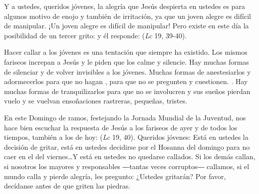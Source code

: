 \begin{body}
Y a ustedes, queridos jóvenes, la alegría que Jesús despierta en ustedes es para algunos motivo de enojo y también de irritación, ya que un joven alegre es difícil de manipular. ¡Un joven alegre es difícil de manipular! Pero existe en este día la posibilidad de un tercer grito:  y él responde:  (\textit{Lc} 19, 39-40).

Hacer callar a los jóvenes es una tentación que siempre ha existido. Los mismos fariseos increpan a Jesús y le piden que los calme y silencie. Hay muchas formas de silenciar y de volver invisibles a los jóvenes. Muchas formas de anestesiarlos y adormecerlos para que no hagan , para que no se pregunten y cuestionen. . Hay muchas formas de tranquilizarlos para que no se involucren y sus sueños pierdan vuelo y se vuelvan ensoñaciones rastreras, pequeñas, tristes.


En este Domingo de ramos, festejando la Jornada Mundial de la Juventud, nos hace bien escuchar la respuesta de Jesús a los fariseos de ayer y de todos los tiempos, también a los de hoy:  (\textit{Lc} 19, 40). Queridos jóvenes: Está en ustedes la decisión de gritar, está en ustedes decidirse por el Hosanna del domingo para no caer en el  del viernes\ldots Y está en ustedes no quedarse callados. Si los demás callan, si nosotros los mayores y responsables ―tantas veces corruptos― callamos, si el mundo calla y pierde alegría, les pregunto: ¿Ustedes gritarán? Por favor, decídanse antes de que griten las piedras.
\end{body}


